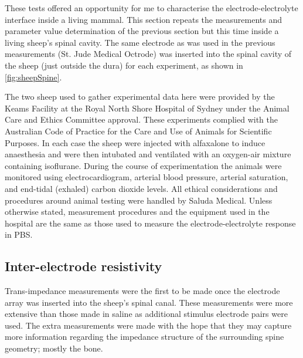   These tests offered an opportunity for me to characterise the electrode-electrolyte interface inside a living mammal.
  This section repeats the measurements and parameter value determination of the previous section but this time inside a living sheep's spinal cavity.
  The same electrode as was used in the previous measurements (St. Jude Medical Octrode) was inserted into the spinal cavity of the sheep (just outside the dura) for each experiment, as shown in \cref{fig:sheepSpine}.

  The two sheep used to gather experimental data here were provided by the Keams Facility at the Royal North Shore Hospital of Sydney under the Animal Care and Ethics Committee approval.
  These experiments complied with the Australian Code of Practice for the Care and Use of Animals for Scientific Purposes.
  In each case the sheep were injected with alfaxalone to induce anaesthesia and were then intubated and ventilated with an oxygen-air mixture containing isoflurane.
  During the course of experimentation the animals were monitored using electrocardiogram, arterial blood pressure, arterial saturation, and end-tidal (exhaled) carbon dioxide levels.
  All ethical considerations and procedures around animal testing were handled by Saluda Medical.
  Unless otherwise stated, measurement procedures and the equipment used in the hospital are the same as those used to measure the electrode-electrolyte response in PBS.

  \subsection{Inter-electrode resistivity}

    Trans-impedance measurements were the first to be made once the electrode array was inserted into the sheep's spinal canal.
    These measurements were more extensive than those made in saline as additional stimulus electrode pairs were used.
    The extra measurements were made with the hope that they may capture more information regarding the impedance structure of the surrounding spine geometry; mostly the bone.

